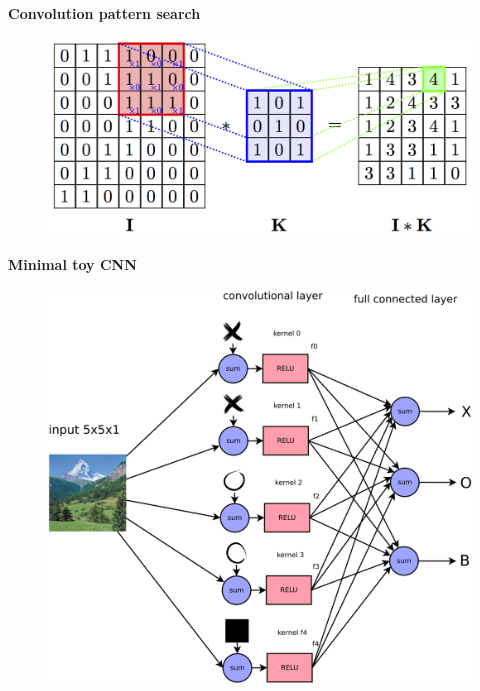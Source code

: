 \documentclass[xcolor=dvipsnames]{beamer}
\begin{document}
\begin{frame}{\bf Convolution pattern search}
\begin{figure}
  \includegraphics[scale=0.8]{../../diagrams/nn/convolution_2d.png}
\end{figure}

\end{frame}


\begin{frame}{\bf Minimal toy CNN}

\begin{figure}
  \includegraphics[scale=0.2]{../../diagrams/nn/toy_cnn.png}
\end{figure}

\end{frame}
\end{document}

